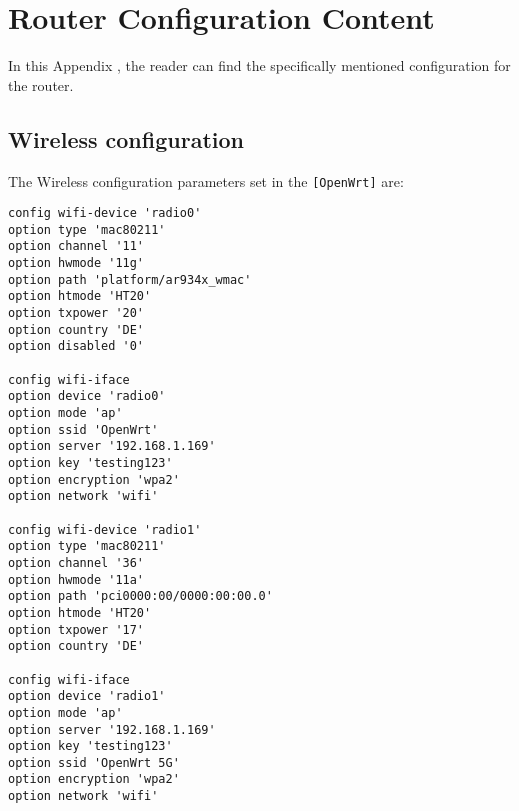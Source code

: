 
\chapter{Router Configuration Content}\label{app:ch:Routerconfig}

In this Appendix , the reader can find the specifically mentioned configuration for the router.

\section{Wireless configuration}\label{app:sec:wireless_config}
The Wireless configuration parameters set in the \verb|[OpenWrt]| are:
\begin{lstlisting}[frame=single]
config wifi-device 'radio0'
option type 'mac80211'
option channel '11'
option hwmode '11g'
option path 'platform/ar934x_wmac'
option htmode 'HT20'
option txpower '20'
option country 'DE'
option disabled '0'

config wifi-iface
option device 'radio0'
option mode 'ap'
option ssid 'OpenWrt'
option server '192.168.1.169'
option key 'testing123'
option encryption 'wpa2'
option network 'wifi'

config wifi-device 'radio1'
option type 'mac80211'
option channel '36'
option hwmode '11a'
option path 'pci0000:00/0000:00:00.0'
option htmode 'HT20'
option txpower '17'
option country 'DE'

config wifi-iface
option device 'radio1'
option mode 'ap'
option server '192.168.1.169'
option key 'testing123'
option ssid 'OpenWrt 5G'
option encryption 'wpa2'
option network 'wifi'
\end{lstlisting}
